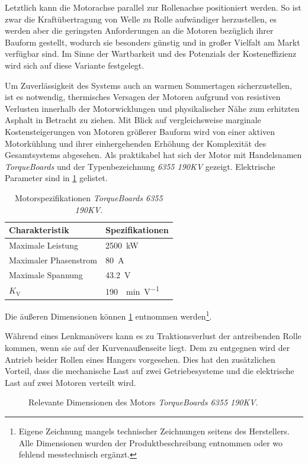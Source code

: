	Letztlich kann die Motorachse parallel zur Rollenachse positioniert werden.
	So ist zwar die Kraftübertragung von Welle zu Rolle aufwändiger herzustellen, es werden aber die geringsten Anforderungen an die Motoren bezüglich ihrer Bauform gestellt, wodurch sie besonders günstig und in großer Vielfalt am Markt verfügbar sind.
	Im Sinne der Wartbarkeit und des Potenzials der Kosteneffizienz wird sich auf diese Variante festgelegt.\par\medskip
	Um Zuverlässigkeit des Systems auch an warmen Sommertagen sicherzustellen, ist es notwendig, thermisches Versagen der Motoren aufgrund von resistiven Verlusten innerhalb der Motorwicklungen und physikalischer Nähe zum erhitzten Asphalt in Betracht zu ziehen.
	Mit Blick auf vergleichsweise marginale Kostensteigerungen von Motoren größerer Bauform wird von einer aktiven Motorkühlung und ihrer einhergehenden Erhöhung der Komplexität des Gesamtsystems abgesehen.
	Als praktikabel hat sich der Motor mit Handelsnamen \textit{TorqueBoards} und der Typenbezeichnung \textit{6355 190KV} gezeigt.
	Elektrische Parameter sind in \cref{tab:TB 6355 190KV electrical specs} gelistet.
	\begin{table}[h]
		\centering
		\caption[Motorspezifikationen \textit{TorqueBoards 6355 190KV}]{Motorspezifikationen \textit{TorqueBoards 6355 190KV}.}%
		\label{tab:TB 6355 190KV electrical specs}
		\begin{tabular}{p{}l}
			\toprule
			Charakteristik					& Spezifikationen\\ \midrule
			Maximale Leistung				& \qty{2500}{\kilo\watt}\\
			Maximaler Phasenstrom			& \qty{80}{\ampere}\\
			Maximale Spannung				& \qty{43,2}{\volt}\\
			\(K_\text{V}\)					& \qty{190}{\per\minute\per\volt}\\ \bottomrule
		\end{tabular}
	\end{table}
	Die äußeren Dimensionen können \cref{fig:motor} entnommen werden\footnote{\hspace{1mm} Eigene Zeichnung mangels technischer Zeichnungen seitens des Herstellers.
	Alle Dimensionen wurden der Produktbeschreibung entnommen oder wo fehlend messtechnisch ergänzt.}.
	
	Während eines Lenkmanövers kann es zu Traktionsverlust der antreibenden Rolle kommen, wenn sie auf der Kurvenaußenseite liegt.
	Dem zu entgegnen wird der Antrieb beider Rollen eines Hangers vorgesehen.
	Dies hat den zusätzlichen Vorteil, dass die mechanische Last auf zwei Getriebesysteme und die elektrische Last auf zwei Motoren verteilt wird.
	\begin{figure}[h]
		\centering
		
		\caption{Relevante Dimensionen des Motors \textit{TorqueBoards 6355 190KV}.}%
		\label{fig:motor}
	\end{figure}
